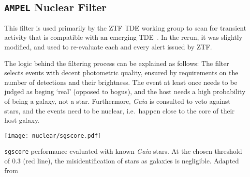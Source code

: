 \subsection{\texttt{AMPEL} Nuclear Filter}\label{nuclear_filter}

This filter is used primarily by the ZTF TDE working group to scan for transient activity that is compatible with an emerging TDE~\cite{Velzen2021a}. In the rerun, it was slightly modified, and used to re-evaluate each and every alert issued by ZTF.

The logic behind the filtering process can be explained as follows: The filter selects events with decent photometric quality, ensured by requirements on the number of detections and their brightness. The event at least once needs to be judged as beging `real' (opposed to bogus), and the host needs a high probability of being a galaxy, not a star. Furthermore, \textit{Gaia} is consulted to veto against stars, and the events need to be nuclear, i.e.~happen close to the core of their host galaxy.

\begin{marginfigure}
  \texttt{[image: nuclear/sgscore.pdf]}
  \caption[\texttt{sgscore} performance]{\texttt{sgscore} performance evaluated with known \textit{Gaia} stars. At the chosen threshold of 0.3 (red line), the misidentification of stars as galaxies is negligible. Adapted from~\cite{Tachibana2018}}
\end{marginfigure}

